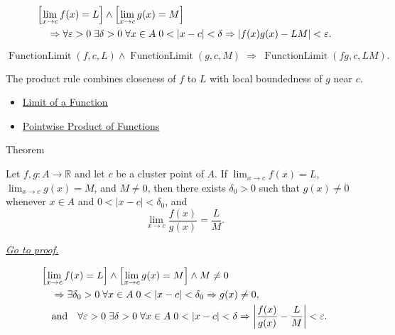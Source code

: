 \begin{remark*}
\[
\begin{aligned}
&\Bigl[\lim_{x\to c}f(x)=L\Bigr]\wedge\Bigl[\lim_{x\to c}g(x)=M\Bigr] \\
&\quad\Rightarrow
\forall\varepsilon>0\;\exists\delta>0\;\forall x\in A\;
0<|x-c|<\delta\Rightarrow |f(x)g(x)-LM|<\varepsilon.
\end{aligned}
\]
\end{remark*}

\begin{remark*}
\[
  \operatorname{FunctionLimit}(f,c,L)\wedge\operatorname{FunctionLimit}(g,c,M)
  \;\Longrightarrow\;
  \operatorname{FunctionLimit}(fg,c,LM).
\]
\end{remark*}

\begin{remark*}[Interpretation]
The product rule combines closeness of $f$ to $L$ with local boundedness
of $g$ near $c$.
\end{remark*}

\begin{dependencies}
\begin{itemize}
  \item \hyperref[def:limit-function]{Limit of a Function}
  \item \hyperref[def:pointwise-product-of-functions]{Pointwise Product of Functions}
\end{itemize}
\end{dependencies}


\begin{theorembox}{Theorem}
\begin{theorem}
\label{thm:limit-quotient}
Let $f,g:A\to\mathbb{R}$ and let $c$ be a cluster point of $A$. If
$\lim_{x\to c}f(x)=L$, $\lim_{x\to c}g(x)=M$, and $M\neq 0$, then
there exists $\delta_0>0$ such that $g(x)\neq 0$ whenever $x\in A$ and
$0<|x-c|<\delta_0$, and
\[
  \lim_{x\to c}\frac{f(x)}{g(x)}=\frac{L}{M}.
\]

\smallskip\noindent
\hyperref[prf:limit-quotient]{\textit{Go to proof.}}
\end{theorem}
\end{theorembox}

\begin{remark*}
\[
\begin{aligned}
&\Bigl[\lim_{x\to c}f(x)=L\Bigr]\wedge\Bigl[\lim_{x\to c}g(x)=M\Bigr]\wedge M\neq 0 \\
&\quad\Rightarrow
\exists\delta_0>0\;\forall x\in A\;
0<|x-c|<\delta_0\Rightarrow g(x)\neq 0, \\
&\quad\text{and}\quad
\forall\varepsilon>0\;\exists\delta>0\;\forall x\in A\;
0<|x-c|<\delta\Rightarrow
\left|\frac{f(x)}{g(x)}-\frac{L}{M}\right|<\varepsilon.
\end{aligned}
\]
\end{remark*}

